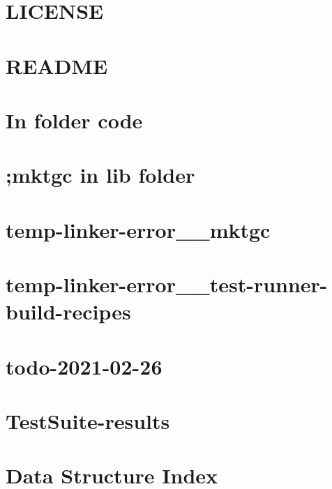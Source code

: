 \let\mypdfximage\pdfximage\def\pdfximage{\immediate\mypdfximage}\documentclass[twoside]{book}
\newcommand{\+}{\discretionary{\mbox{\scriptsize$\hookleftarrow$}}{}{}}
\begin{document}
\chapter{LICENSE}
\label{md_mock_c_LICENSE}

\chapter{README}
\label{md_mock_c_README}

\chapter{In folder code}
\label{md_mock_c_vim_cheatsheet}

\chapter{;mktgc in lib folder}
\label{md_temp_linker_error__build_unit_tests}

\chapter{temp-\/linker-\/error\+\_\+\+\_\+mktgc}
\label{md_temp_linker_error__mktgc}

\chapter{temp-\/linker-\/error\+\_\+\+\_\+test-\/runner-\/build-\/recipes}
\label{md_temp_linker_error__test_runner_build_recipes}

\chapter{todo-\/2021-\/02-\/26}
\label{md_todo_2021_02_26}

\chapter{Test\+Suite-\/results}
\label{md_vis_spi_out_build_TestSuite_results}

\chapter{Data Structure Index}

\end{document}
